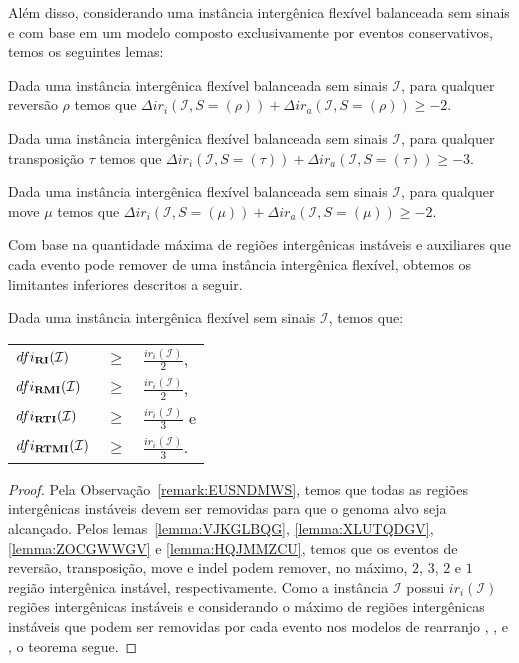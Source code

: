 Além disso, considerando uma instância intergênica flexível balanceada sem sinais e com base em um modelo composto exclusivamente por eventos conservativos, temos os seguintes lemas:

\begin{lemma}\label{lemma:IERALSKC}
Dada uma instância intergênica flexível balanceada sem sinais $\mathcal{I}$, para qualquer reversão $\rho$ temos que $\Delta ir_i(\mathcal{I}, S = (\rho)) + \Delta ir_a(\mathcal{I}, S = (\rho)) \ge -2$.
\end{lemma}

\begin{lemma}\label{lemma:FOXQSODF}
Dada uma instância intergênica flexível balanceada sem sinais $\mathcal{I}$, para qualquer transposição $\tau$ temos que $\Delta ir_i(\mathcal{I}, S = (\tau)) + \Delta ir_a(\mathcal{I}, S = (\tau)) \ge -3$.
\end{lemma}

\begin{lemma}\label{lemma:AXMNYRLB}
Dada uma instância intergênica flexível balanceada sem sinais $\mathcal{I}$, para qualquer move $\mu$ temos que $\Delta ir_i(\mathcal{I}, S = (\mu)) + \Delta ir_a(\mathcal{I}, S = (\mu)) \ge -2$.
\end{lemma}

Com base na quantidade máxima de regiões intergênicas instáveis e auxiliares que cada evento pode remover de uma instância intergênica flexível, obtemos os  limitantes inferiores descritos a seguir.

\begin{theorem}\label{theorem:BOTBXFZQ}
Dada uma instância intergênica flexível sem sinais $\mathcal{I}$, temos que:

\begin{tabular}{lll}
  $dfi_{\textbf{RI}}(\mathcal{I})$     & $ \ge $ & $\frac{ir_i(\mathcal{I})}{2}$,  \\
  $dfi_{\textbf{RMI}}(\mathcal{I})$    & $ \ge $ & $\frac{ir_i(\mathcal{I})}{2}$,  \\
  $dfi_{\textbf{RTI}}(\mathcal{I})$    & $ \ge $ & $\frac{ir_i(\mathcal{I})}{3}$ e \\
  $dfi_{\textbf{RTMI}}(\mathcal{I})$   & $ \ge $ & $\frac{ir_i(\mathcal{I})}{3}$.  \\
\end{tabular}
\end{theorem}
\begin{proof}
Pela Observação~\ref{remark:EUSNDMWS}, temos que todas as regiões intergênicas instáveis devem ser removidas para que o genoma alvo seja alcançado. Pelos lemas~\ref{lemma:VJKGLBQG}, \ref{lemma:XLUTQDGV}, \ref{lemma:ZOCGWWGV} e \ref{lemma:HQJMMZCU}, temos que os eventos de reversão, transposição, move e indel podem remover, no máximo, $2$, $3$, $2$ e $1$ região intergênica instável, respectivamente. Como a instância $\mathcal{I}$ possui $ir_i(\mathcal{I})$ regiões intergênicas instáveis e considerando o máximo de regiões intergênicas instáveis que podem ser removidas por cada evento nos modelos de rearranjo \RI{}, \RMI{}, \RTI{} e \RTMI{}, o teorema segue.
\end{proof}

